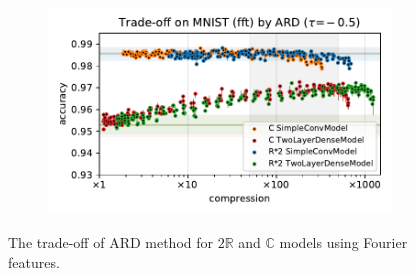 \documentclass[a4paper,10pt,twocolumn]{article}
\newcommand{\real}{\mathbb{R}}
\newcommand{\cplx}{\mathbb{C}}
\begin{document}
\begin{figure}[b]
\begin{subfigure}[b]{0.5\columnwidth}
  \end{subfigure}%
  \begin{subfigure}[b]{0.5\columnwidth}
    \centering
    \includegraphics[width=\linewidth]{figure__mnist-like__trade-off/appendix__cmp__ARD__mnist__fft__-0.5.pdf}
  \end{subfigure}
  \caption{%
    The trade-off of ARD method for $2\real$ and $\cplx$ models using Fourier features.
  }
  \label{fig:appendix__cmp__mnist-like__trade-off__ARD__fft}
\end{figure}
\end{document}
